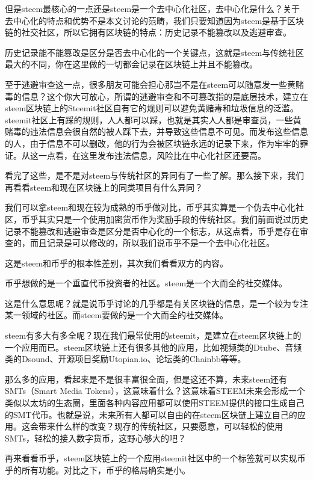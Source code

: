 \documentclass[]{ctexbook}
\begin{document}
但是steem最核心的一点还是steem是一个去中心化社区，去中心化是什么？关于去中心化的特点和优势不是本文讨论的范畴，我们只要知道因为steem是基于区块链的社交社区，所以它拥有区块链的特点：历史记录不能篡改以及逃避审查。

历史记录能不能篡改是区分是否去中心化的一个关键点，这就是steem与传统社区最大的不同，你在这里做的一切都会记录在区块链上并且不能篡改。

至于逃避审查这一点，很多朋友可能会担心那岂不是在steem可以随意发一些黄赌毒的信息？这个你大可放心，所谓的逃避审查和不可篡改指的是底层技术，建立在steem区块链上的Steemit社区自有它的规则可以避免黄赌毒和垃圾信息的泛滥。steemit社区上有踩的规则，人人都可以踩，也就是其实人人都是审查员，一些黄赌毒的违法信息会很自然的被人踩下去，并导致这些信息不可见。而发布这些信息的人，由于信息不可以删改，他的行为会被区块链永远的记录下来，作为牢牢的罪证。从这一点看，在这里发布违法信息，风险比在中心化社区还要高。

看完了这些，是不是对steem与传统社区的异同有了一些了解。那么接下来，我们再看看steem和现在区块链上的同类项目有什么异同？

我们可以拿steem和现在较为成熟的币乎做对比，币乎其实算是一个伪去中心化社区，币乎其实只是一个使用加密货币作为奖励手段的传统社区。我们前面说过历史记录不能篡改和逃避审查是区分是否中心化的一个标志，从这点看，币乎是存在审查的，而且记录是可以修改的，所以我们说币乎不是一个去中心化社区。

这是steem和币乎的根本性差别，其次我们看看双方的内容。

币乎想做的是一个垂直代币投资者的社区。steem是一个大而全的社交媒体。

这是什么意思呢？就是说币乎讨论的几乎都是有关区块链的信息，是一个较为专注某一领域的社区。而steem要做的是一个大而全的社交媒体。

steem有多大有多全呢？现在我们最常使用的steemit，是建立在steem区块链上的一个应用而已。steem区块链上还有很多其他的应用，比如视频类的Dtube、音频类的Dsound、开源项目奖励Utopian.io、论坛类的Chainbb等等。

那么多的应用，看起来是不是很丰富很全面，但是这还不算，未来steem还有SMTs（Smart Media Tokens），这意味着什么？这意味着STEEM未来会形成一个类似以太坊的生态圈，里面各种内容应用都可以使用STEEM提供的接口生成自己的SMT代币。也就是说，未来所有人都可以自由的在steem区块链上建立自己的应用。这会带来什么样的改变？现存的传统社区，只要愿意，可以轻松的使用SMTs，轻松的接入数字货币，这野心够大的吧？

再来看看币乎，steem区块链上的一个应用steemit社区中的一个标签就可以实现币乎的所有功能。对比之下，币乎的格局确实是小。
\end{document}
